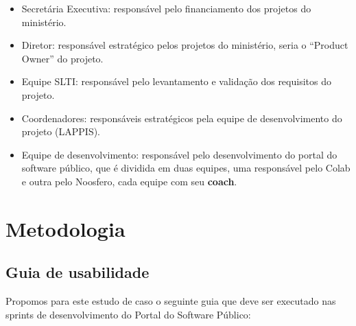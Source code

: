 \begin{itemize}

\item Secretária Executiva: responsável pelo financiamento dos projetos do ministério.

\item Diretor: responsável estratégico pelos projetos do ministério, seria o ``Product Owner'' do projeto.

\item Equipe SLTI: responsável pelo levantamento e validação dos requisitos do projeto.

\item Coordenadores: responsáveis estratégicos pela equipe de desenvolvimento do projeto (LAPPIS).

\item Equipe de desenvolvimento: responsável pelo desenvolvimento do portal do software público, que é dividida em duas equipes, uma responsável pelo Colab e outra pelo Noosfero, cada equipe com seu \textbf{coach}.

\end{itemize}

\section{Metodologia}
	

\subsection{Guia de usabilidade}

	Propomos  para este estudo de caso o seguinte guia que deve ser executado nas sprints de desenvolvimento do Portal do Software Público:
	
